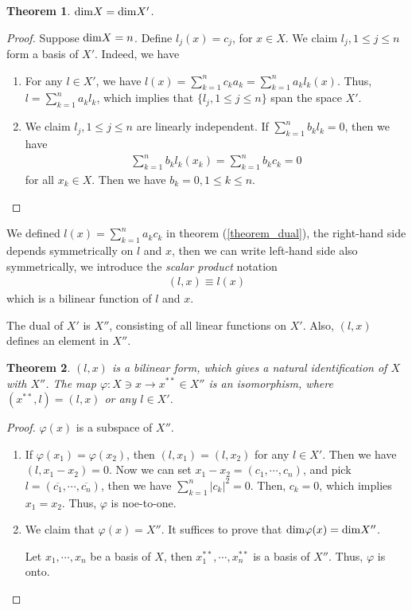 \documentclass[11pt]{book}
\newtheorem{theorem}{Theorem}[section]
\theoremstyle{definition}
\numberwithin{equation}{subsection}
\begin{document}
\begin{theorem}
${\rm dim}X = {\rm dim}X'$.
\end{theorem}
\begin{proof}
Suppose ${\rm dim}X = n$. Define $l_j(x) = c_j$, for $x\in X$. We claim $l_j, 1\leq j\leq n$ form a basis of $X'$. Indeed, we have
\begin{enumerate}[label=(\arabic*)]
    \item For any $l\in X'$, we have $l(x) = \sum^n_{k=1}c_k a_k = \sum^n_{k=1}a_k l_k(x)$. Thus, $l = \sum^n_{k=1}a_k l_k$, which implies that $\{l_j, 1\leq j\leq n\}$ span the space $X'$.
    \item We claim $l_j, 1\leq j\leq n$ are linearly independent. If $\sum^n_{k=1}b_k l_k = 0$, then we have 
    \begin{align*}
        \sum^n_{k=1}b_k l_k(x_k) = \sum^n_{k=1}b_k c_k = 0
    \end{align*}
    for all $x_k\in X$. Then we have $b_k = 0, 1\leq k \leq n$.
\end{enumerate}
\end{proof}

\medskip

We defined $l(x) = \sum^n_{k=1} a_k c_k$ in theorem (\ref{theorem_dual}), the right-hand side depends symmetrically on $l$ and $x$, then we can write left-hand side also symmetrically, we introduce the \emph{scalar product} notation
\begin{align*}
    (l,x) \equiv l(x)
\end{align*}
which is a bilinear function of $l$ and $x$. 

The dual of $X'$ is $X''$, consisting of all linear functions on $X'$. Also, $(l,x)$ defines an element in $X''$.

\begin{theorem}
$(l,x)$ is a bilinear form, which gives a natural identification of $X$ with $X''$. The map $\varphi:X\ni x \to x^{**}\in X''$ is an isomorphism, where $(x^{**},l) = (l,x)$ or any $l\in X'$.
\end{theorem}
\begin{proof}
$\varphi(x)$ is a subspace of $X''$.
\begin{enumerate}[label=(\arabic*)]
    \item If $\varphi(x_1) = \varphi(x_2)$, then $(l,x_1) = (l,x_2)$ for any $l\in X'$. Then we have $(l,x_1 - x_2) = 0$. Now we can set $x_1 - x_2 = (c_1,\cdots,c_n)$, and pick $l = (\overline{c_1},\cdots,\overline{c_n})$, then we have $\sum^n_{k=1}|c_k|^2 = 0$. Then, $c_k = 0$, which implies $x_1 = x_2$. Thus, $\varphi$ is noe-to-one.
    \item We claim that $\varphi(x) = X''$. It suffices to prove that ${\rm dim}\varphi(x) = {\rm dim}X''$.
    
    Let $x_1,\cdots,x_n$ be a basis of $X$, then $x_1^{**},\cdots,x_n^{**}$ is a basis of $X''$. Thus, $\varphi$ is onto.
\end{enumerate}
\end{proof}
\end{document}
